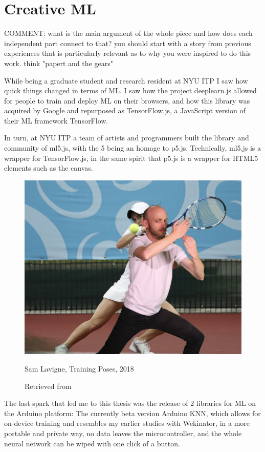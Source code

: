 \section{Creative ML}

COMMENT: what is the main argument of the whole piece and how does each independent part connect to that? you should start with a story from previous experiences that is particularly relevant as to why you were inspired to do this work. think "papert and the gears"

While being a graduate student and research resident at \acrshort{NYU} \acrshort{ITP} I saw how quick things changed in terms of \acrshort{ML}. I saw how the project deeplearn.js allowed for people to train and deploy \acrshort{ML} on their browsers, and how this library was acquired by Google and repurposed as TensorFlow.js, a JavaScript version of their \acrshort{ML} framework TensorFlow.

In turn, at \acrshort{NYU} \acrshort{ITP} a team of artists and programmers built the library and community of ml5.js, with the 5 being an homage to p5.js. Technically, ml5.js is a wrapper for TensorFlow.js, in the same spirit that p5.js is a wrapper for HTML5 elements such as the canvas.

\begin{figure}[ht]
  \centering
    \includegraphics[width=0.75\linewidth,height=0.25\textheight,keepaspectratio]{images/sam-lavigne-training-poses.jpg}
  \caption{Sam Lavigne, Training Poses, 2018}
  \caption*{Retrieved from \cite{website-sam-lavigne-training-poses}}
  \label{fig:sam-lavigne-training-poses}
\end{figure}

The last spark that led me to this thesis was the release of 2 libraries for \acrshort{ML} on the Arduino platform: The currently beta version Arduino KNN, which allows for on-device training and resembles my earlier studies with Wekinator, in a more portable and private way, no data leaves the microcontroller, and the whole neural network can be wiped with one click of a button.

